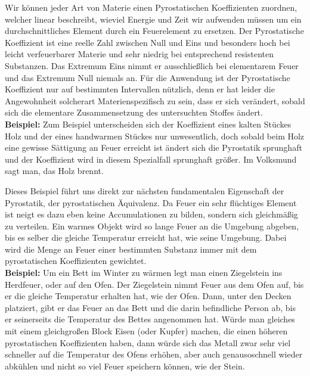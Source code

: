 \documentclass[a5paper,8pt]{book}
\begin{document}
Wir können jeder Art von Materie einen Pyrostatischen Koeffizienten zuordnen, welcher linear beschreibt, wieviel Energie 
und Zeit wir aufwenden müssen um ein durchschnittliches Element durch ein Feuerelement zu ersetzen. Der Pyrostatische 
Koeffizient ist eine reelle Zahl zwischen Null und Eins und besonders hoch bei leicht verfeuerbarer Materie und sehr 
niedrig bei entsprechend resistenten Substanzen. Das Extremum Eins nimmt er ausschließlich bei elementarem Feuer und das 
Extremum Null niemals an.
Für die Anwendung ist der Pyrostatische Koeffizient nur auf bestimmten Intervallen nützlich, denn er hat leider die 
Angewohnheit solcherart Materienspezifisch zu sein, dass er sich verändert, sobald sich die elementare Zusammensetzung des 
untersuchten Stoffes ändert.\\

\textbf{Beispiel:}
Zum Beispiel unterscheiden sich der Koeffizient eines kalten Stückes Holz und der eines handwarmen Stückes nur 
unwesentlich, doch sobald beim Holz eine 
gewisse Sättigung an Feuer erreicht ist ändert sich die Pyrostatik sprunghaft und der Koeffizient wird in diesem 
Spezialfall sprunghaft größer. Im Volksmund sagt man, das Holz brennt.\\




Dieses Beispiel führt uns direkt zur nächsten fundamentalen Eigenschaft der Pyrostatik, der pyrostatischen Äquivalenz. Da 
Feuer ein sehr flüchtiges Element ist neigt es dazu eben keine Accumulationen zu bilden, sondern sich gleichmäßig zu 
verteilen. Ein warmes Objekt wird so lange Feuer an die Umgebung abgeben, bis es selber die gleiche Temperatur erreicht 
hat, wie seine Umgebung. Dabei wird die Menge an Feuer einer bestimmten Substanz immer mit dem pyrostatischen Koeffizienten 
gewichtet.\\

\textbf{Beispiel:}
Um ein Bett im Winter zu wärmen legt man einen Ziegelstein ins Herdfeuer, oder auf den Ofen. Der Ziegelstein nimmt Feuer 
aus dem Ofen auf, bis er die gleiche Temperatur erhalten hat, wie der Ofen. Dann, unter den Decken platziert, gibt er das 
Feuer an das Bett und die darin befindliche Person ab, bis er seinerseits die Temperatur des Bettes angenommen hat.
Würde man gleiches mit einem gleichgroßen Block Eisen (oder Kupfer) machen, die einen höheren pyrostatischen Koeffizienten 
haben,  dann würde sich das Metall zwar sehr viel schneller auf die Temperatur des Ofens erhöhen, aber auch genausoschnell 
wieder abkühlen und nicht so viel Feuer speichern können, wie der Stein.
\end{document}
